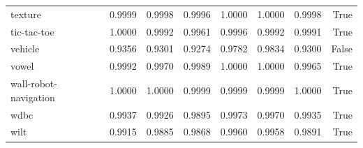 \begin{table}[htbp]
\begin{tabular}{lrrrrrrr}
texture & 0.9999 & 0.9998 & 0.9996 & 1.0000 & 1.0000 & 0.9998 & True \\
tic-tac-toe & 1.0000 & 0.9992 & 0.9961 & 0.9996 & 0.9992 & 0.9991 & True \\
vehicle & 0.9356 & 0.9301 & 0.9274 & 0.9782 & 0.9834 & 0.9300 & False \\
vowel & 0.9992 & 0.9970 & 0.9989 & 1.0000 & 1.0000 & 0.9965 & True \\
wall-robot-navigation & 1.0000 & 1.0000 & 0.9999 & 0.9999 & 0.9999 & 1.0000 & True \\
wdbc & 0.9937 & 0.9926 & 0.9895 & 0.9973 & 0.9970 & 0.9935 & True \\
wilt & 0.9915 & 0.9885 & 0.9868 & 0.9960 & 0.9958 & 0.9891 & True \\
\hline
\end{tabular}
\end{table}

